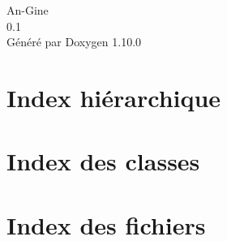 \documentclass[twoside]{book}
\newcommand{\+}{\discretionary{\mbox{\scriptsize$\hookleftarrow$}}{}{}}
\newcommand{\clearemptydoublepage}{%
    \newpage{\pagestyle{empty}\cleardoublepage}%
  }
\begin{document}
  \raggedbottom
    \hypersetup{pageanchor=false,
                bookmarksnumbered=true,
                pdfencoding=unicode
               }
  \begin{titlepage}
  \vspace*{7cm}
  \begin{center}%
  {\Large An-\/\+Gine}\\
  [1ex]\large 0.\+1 \\
  \vspace*{1cm}
  {\large Généré par Doxygen 1.10.0}\\
  \end{center}
  \end{titlepage}
  \clearemptydoublepage
  \tableofcontents
  \clearemptydoublepage
  \hypersetup{pageanchor=true}
\chapter{Index hiérarchique}

\chapter{Index des classes}

\chapter{Index des fichiers}

\end{document}
